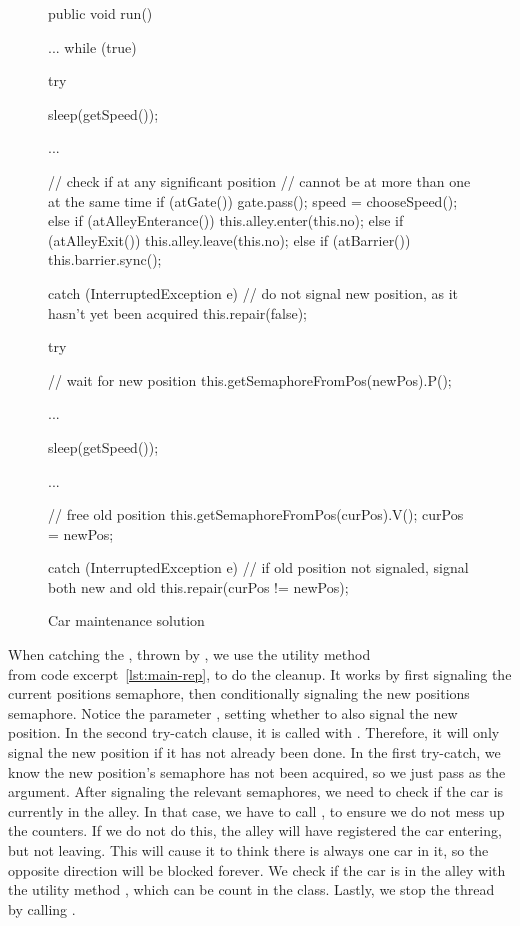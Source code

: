 \begin{figure}[H]
\label{lst:main-run}
  \begin{java}
public void run() {
    ...
    while (true) {
        try {
            sleep(getSpeed());

            ...

            // check if at any significant position
            // cannot be at more than one at the same time
            if (atGate()) {
                gate.pass();
                speed = chooseSpeed();
            } else if (atAlleyEnterance()) {
                this.alley.enter(this.no);
            } else if (atAlleyExit()) {
                this.alley.leave(this.no);
            } else if (atBarrier()) {
                this.barrier.sync();
            }

        } catch (InterruptedException e) {
            // do not signal new position, as it hasn't yet been acquired
            this.repair(false);
        }

        try {
            // wait for new position
            this.getSemaphoreFromPos(newPos).P();

            ...

            sleep(getSpeed());

            ...

            // free old position
            this.getSemaphoreFromPos(curPos).V();
            curPos = newPos;

        } catch (InterruptedException e) {
            // if old position not signaled, signal both new and old
            this.repair(curPos != newPos);
        }
    }
}
  \end{java}
  \caption{Car maintenance solution}
\end{figure}

When catching the , thrown by
, we use the utility method \\
 from code excerpt~\ref{lst:main-rep}, to do
the cleanup. It works by first signaling the current positions
semaphore, then conditionally signaling the new positions
semaphore. Notice the parameter , setting whether to
also signal the new position. In the second try-catch clause, it is
called with . Therefore, it will only
signal the new position if it has not already been done. In the first
try-catch, we know the new position's semaphore has not been acquired,
so we just pass  as the argument. After signaling the
relevant semaphores, we need to check if the car is currently in the
alley. In that case, we have to call , to ensure we do not mess up the counters. If we do not do
this, the alley will have registered the car entering, but not
leaving. This will cause it to think there is always one car in it, so
the opposite direction will be blocked forever. We check if the car is
in the alley with the utility method , which can be
count in the  class. Lastly, we stop the thread by calling .

